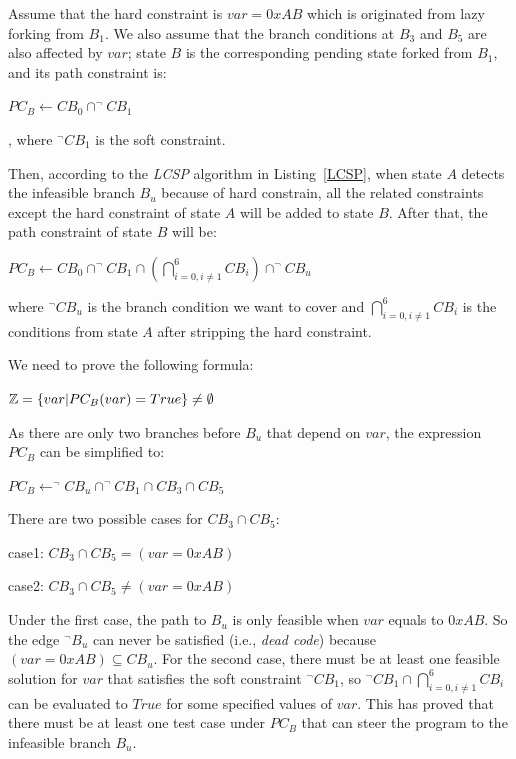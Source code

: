  Assume that the hard constraint is $var=0xAB$ which is originated from lazy forking from $B_1$. 
  We also assume that the branch conditions at $B_3$ and $B_5$ are also affected by $var$; state $B$ is the corresponding pending state forked from $B_1$, and its path constraint is:
\begin{center}
$PC_B\leftarrow\displaystyle CB_0 \cap ^\neg CB_1$
\end{center}
, where $^\neg CB_1$ is the soft constraint.

Then, according to the \textit{LCSP} algorithm in Listing~\ref{LCSP}, when state $A$ detects the infeasible branch $B_u$ because of hard constrain, all the related constraints except the hard constraint of state $A$ will be added to state $B$. After that, the path constraint of state $B$ will be:

\begin{center}
$PC_B\leftarrow\displaystyle CB_0 \cap ^\neg CB_1 \cap (\bigcap\limits_{i=0,i \neq 1}^{6} CB_i) \cap ^\neg CB_u$
\end{center}
where $^\neg CB_u $ is the branch condition we want to cover and $\bigcap_{i=0,i \neq 1}^{6} CB_i$ is the conditions from state $A$ after stripping the hard constraint.

We need to prove the following formula:

\begin{center}
$\mathbb{Z}=\{var\arrowvert PC_B(var) = True\} \neq \emptyset$
\end{center}

As there are only two branches before $B_u$ that depend on $var$, the expression $PC_B$ can be simplified to:
\begin{center}
$PC_B\leftarrow^\neg CB_u \cap ^\neg CB_1 \cap CB_3 \cap CB_5$
\end{center}

There are two possible cases for $CB_3 \cap CB_5$:
\begin{center}
case1: $CB_3 \cap CB_5 = (var = 0xAB)$

case2: $CB_3 \cap CB_5 \neq (var = 0xAB)$
\end{center}

Under the first case, the path to $B_u$ is only feasible when $var$ equals to $0xAB$. So the edge $^\neg B_u$ can never be satisfied (i.e., \emph{dead code}) because $(var = 0xAB) \subseteq CB_u$. For the second case, there must be at least one feasible solution for $var$ that satisfies the soft constraint $^\neg CB_1$, so $^\neg CB_1 \cap \bigcap_{i=0,i \neq 1}^{6} CB_i$ can be evaluated to $True$ for some specified values of $var$. This has proved that there must be at least one test case under $PC_B$ that can steer the program to the infeasible branch $B_u$.


